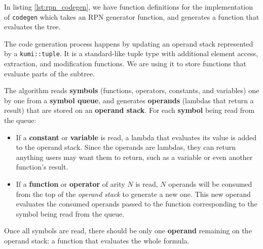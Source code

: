 \documentclass[../main]{subfiles}
\begin{document}
In listing \ref{lst:rpn_codegen}, we have function definitions for the
implementation of \lstinline{codegen} which takes an RPN generator function,
and generates a function that evaluates the tree.

The code generation process happens by updating an operand stack represented
by a \lstinline{kumi::tuple}. It is a standard-like tuple type with additional
element access, extraction, and modification functions.
We are using it to store functions that evaluate parts of the subtree.

The algorithm reads \textbf{symbols} (\ie functions, operators, constants, and
variables) one by one from a \textbf{symbol queue}, and generates
\textbf{operands} (\ie \cpp lambdas that return a result) that are stored on an
\textbf{operand stack}. For each \textbf{symbol} being read from the queue:

\begin{itemize}
\item If a \textbf{constant} or \textbf{variable} is read, a lambda that
evaluates its value is added to the operand stack.
Since the operands are \cpp lambdas, they can return
anything users may want them to return, such as a \cpp variable
or even another function's result.

\item If a \textbf{function} or \textbf{operator} of arity $N$ is read,
$N$ operands will be consumed from the top of the \textit{operand stack}
to generate a new one. This new operand evaluates the consumed operands passed
to the function corresponding to the symbol being read from the queue.
\end{itemize}

Once all symbols are read, there should be only one \textbf{operand} remaining
on the operand stack: a function that evaluates the whole formula.

\clearpage%
\end{document}
